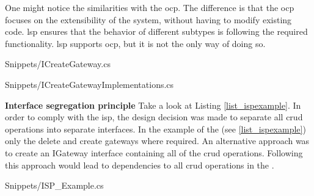 One might notice the similarities with the \gls{ocp}. The difference is that the \gls{ocp}
focuses on the extensibility of the system, without having to modify existing code.
\gls{lsp} ensures that the behavior of different subtypes is following the required
functionality. \gls{lsp} supports \gls{ocp}, but it is not the only way of doing so.


    {Snippets/ICreateGateway.cs}


    {Snippets/ICreateGatewayImplementations.cs}

\textbf{Interface segregation principle}
Take a look at Listing \ref{list_ispexample}. In order to comply with the \gls{isp}, the
design decision was made to separate all \gls{crud} operations into separate interfaces.
In the example of the  (see \ref{list_ispexample})
only the delete and create gateways where required. An alternative approach was to create
an IGateway interface containing all of the \gls{crud} operations. Following this approach
would lead to dependencies to all \gls{crud} operations in the
.


    {Snippets/ISP_Example.cs}